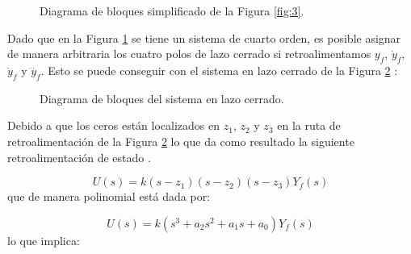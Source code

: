 \documentclass{article}
\begin{document}
\begin{figure}[H]
    \centering
        \caption{Diagrama de bloques  simplificado de la Figura \ref{fig:3}.}
        \label{fig:4}
    \end{figure}
    
Dado que en la Figura \ref{fig:4} se tiene un sistema de cuarto orden, es posible asignar de manera arbitraria los cuatro polos de lazo cerrado si retroalimentamos $y_f$, $\dot{y}_f$, $\ddot{y}_f$ y $\dddot{y}_f$.  Esto se puede conseguir con el sistema en lazo cerrado de la Figura \ref{fig:5} \citep{HernandezBook2024}:

\begin{figure}[H]
    \centering
        \caption{Diagrama de bloques del sistema en lazo cerrado.}
        \label{fig:5}
    \end{figure}
    
Debido a que los ceros están localizados en $z_1$, $z_2$ y $z_3$ en la ruta de retroalimentación de la Figura \ref{fig:5} lo que da como resultado la siguiente retroalimentación de estado \citep{HernandezBook2024}.

\begin{equation}
    U(s)=k(s-z_1)(s-z_2)(s-z_3)Y_f(s)
    \label{eq:36}
\end{equation}
que de manera polinomial está dada por:

\begin{equation}
    U(s)=k(s^3+a_2s^2+a_1s+a_0)Y_f(s)
    \label{eq:37}
\end{equation}
lo que implica:
\end{document}
